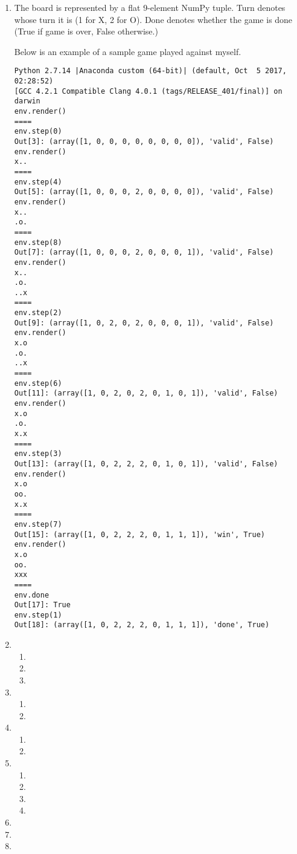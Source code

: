 \documentclass[10pt,letterpaper]{article}
\begin{document}
	\begin{enumerate}
		\item %
		The board is represented by a flat 9-element NumPy tuple. 
		Turn denotes whose turn it is (1 for X, 2 for O).
		Done denotes whether the game is done (True if game is over, False otherwise.)
		
		Below is an example of a sample game played against myself.
		\begin{verbatim}
Python 2.7.14 |Anaconda custom (64-bit)| (default, Oct  5 2017, 02:28:52) 
[GCC 4.2.1 Compatible Clang 4.0.1 (tags/RELEASE_401/final)] on darwin
env.render()
====
env.step(0)
Out[3]: (array([1, 0, 0, 0, 0, 0, 0, 0, 0]), 'valid', False)
env.render()
x..
====
env.step(4)
Out[5]: (array([1, 0, 0, 0, 2, 0, 0, 0, 0]), 'valid', False)
env.render()
x..
.o.
====
env.step(8)
Out[7]: (array([1, 0, 0, 0, 2, 0, 0, 0, 1]), 'valid', False)
env.render()
x..
.o.
..x
====
env.step(2)
Out[9]: (array([1, 0, 2, 0, 2, 0, 0, 0, 1]), 'valid', False)
env.render()
x.o
.o.
..x
====
env.step(6)
Out[11]: (array([1, 0, 2, 0, 2, 0, 1, 0, 1]), 'valid', False)
env.render()
x.o
.o.
x.x
====
env.step(3)
Out[13]: (array([1, 0, 2, 2, 2, 0, 1, 0, 1]), 'valid', False)
env.render()
x.o
oo.
x.x
====
env.step(7)
Out[15]: (array([1, 0, 2, 2, 2, 0, 1, 1, 1]), 'win', True)
env.render()
x.o
oo.
xxx
====
env.done
Out[17]: True
env.step(1)
Out[18]: (array([1, 0, 2, 2, 2, 0, 1, 1, 1]), 'done', True)
		\end{verbatim}
		\item %
		\begin{enumerate}
			\item %
			\item %
			\item %
		\end{enumerate}
		\item %
		\begin{enumerate}
			\item %
			\item %
		\end{enumerate}
		\item %
		\begin{enumerate}
			\item %
			\item %
		\end{enumerate}
		\item %
		\begin{enumerate}
			\item %
			\item %
			\item %
			\item %
		\end{enumerate}
		\item %
		\item %
		\item %
	\end{enumerate}
\end{document}
